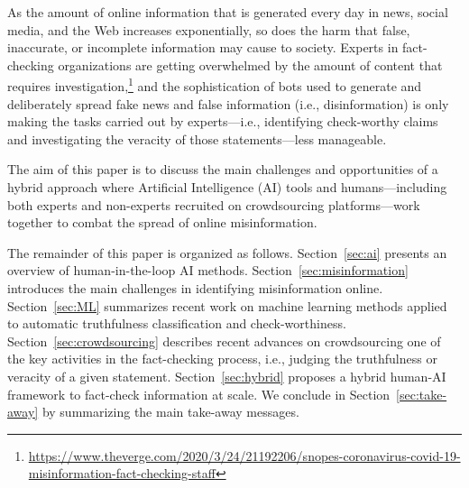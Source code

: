 \documentclass[11pt]{article}
\begin{document}
As the amount of online information that is generated every day in news, social media, and the Web increases exponentially, so does the harm that false, inaccurate, or incomplete information may cause to society.
% 
Experts in fact-checking organizations are getting overwhelmed by the amount of content that requires investigation,\footnote{\url{https://www.theverge.com/2020/3/24/21192206/snopes-coronavirus-covid-19-misinformation-fact-checking-staff}} and the sophistication of bots used to generate and deliberately spread fake news and false information (i.e., disinformation) is only making the tasks carried out by experts---i.e., identifying check-worthy claims and investigating the veracity of those statements---less manageable.

The aim of this paper is to discuss the main challenges and opportunities of a hybrid approach where Artificial Intelligence (AI) tools and humans---including both experts and non-experts recruited on crowdsourcing platforms---work together to combat the spread of online misinformation.

The remainder of this paper is organized as follows. Section~\ref{sec:ai} presents an overview of human-in-the-loop AI methods. 
Section~\ref{sec:misinformation} introduces the main challenges in identifying misinformation online.
Section~\ref{sec:ML} summarizes recent work on machine learning methods applied to automatic truthfulness classification and check-worthiness.
Section~\ref{sec:crowdsourcing} describes recent advances on crowdsourcing one of the key activities in the fact-checking process, i.e., judging the truthfulness or veracity of a given statement.
Section~\ref{sec:hybrid} proposes a hybrid human-AI framework to fact-check information at scale. We conclude in
Section~\ref{sec:take-away} by summarizing the main take-away messages.
\end{document}
